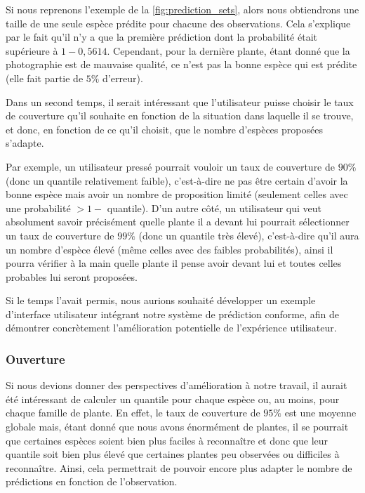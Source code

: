 \documentclass[a4paper,12pt]{article}
\begin{document}
\vspace{0.2cm}

Si nous reprenons l'exemple de la \autoref{fig:prediction_sets}, alors nous obtiendrons une taille de une seule espèce prédite pour chacune des observations. Cela s'explique par le fait qu'il n'y a que la première prédiction dont la probabilité était supérieure à $1 - 0,5614$. Cependant, pour la dernière plante, étant donné que la photographie est de mauvaise qualité, ce n'est pas la bonne espèce qui est prédite (elle fait partie de $5\%$ d'erreur).

\vspace{0.2cm}

Dans un second temps, il serait intéressant que l'utilisateur puisse choisir le taux de couverture qu'il souhaite en fonction de la situation dans laquelle il se trouve, et donc, en fonction de ce qu'il choisit, que le nombre d'espèces proposées s'adapte. 

\vspace{0.2cm}

Par exemple, un utilisateur pressé pourrait vouloir un taux de couverture de $90\%$ (donc un quantile relativement faible), c'est-à-dire ne pas être certain d'avoir la bonne espèce mais avoir un nombre de proposition limité (seulement celles avec une probabilité $> 1 -$ quantile). D'un autre côté, un utilisateur qui veut absolument savoir précisément quelle plante il a devant lui pourrait sélectionner un taux de couverture de $99\%$ (donc un quantile très élevé), c'est-à-dire qu'il aura un nombre d'espèce élevé (même celles avec des faibles probabilités), ainsi il pourra vérifier à la main quelle plante il pense avoir devant lui et toutes celles probables lui seront proposées.

\vspace{0.2cm}

Si le temps l'avait permis, nous aurions souhaité développer un exemple d'interface utilisateur intégrant notre système de prédiction conforme, afin de démontrer concrètement l'amélioration potentielle de l'expérience utilisateur.

\subsubsection{Ouverture}

Si nous devions donner des perspectives d'amélioration à notre travail, il aurait été intéressant de calculer un quantile pour chaque espèce ou, au moins, pour chaque famille de plante. En effet, le taux de couverture de $95\%$ est une moyenne globale mais, étant donné que nous avons énormément de plantes, il se pourrait que certaines espèces soient bien plus faciles à reconnaître et donc que leur quantile soit bien plus élevé que certaines plantes peu observées ou difficiles à reconnaître. Ainsi, cela permettrait de pouvoir encore plus adapter le nombre de prédictions en fonction de l'observation.
\end{document}
